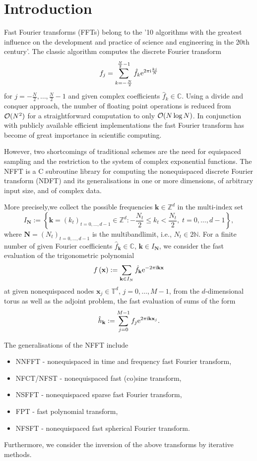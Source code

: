 \hypertarget{index_section_intro_sec}{}\section{Introduction}\label{index_section_intro_sec}
Fast Fourier transforms (FFTs) belong to the '10 algorithms with the greatest influence on the development and practice of science and engineering in the 20th century'. The classic algorithm computes the discrete Fourier transform \[ f_j= \sum_{k=-\frac{N}{2}}^{\frac{N}{2}-1} \hat{f}_{k} {\rm e}^{2\pi{\rm i}\frac{kj}{N}} \] for $j=-\frac{N}{2},\hdots,\frac{N}{2}-1$ and given complex coefficients $\hat{f}_{k}\in\mathbb{C}$. Using a divide and conquer approach, the number of floating point operations is reduced from ${\cal O}(N^2)$ for a straightforward computation to only ${\cal O}(N\log N)$. In conjunction with publicly available efficient implementations the fast Fourier transform has become of great importance in scientific computing.

However, two shortcomings of traditional schemes are the need for equispaced sampling and the restriction to the system of complex exponential functions. The NFFT is a C subroutine library for computing the nonequispaced discrete Fourier transform (NDFT) and its generalisations in one or more dimensions, of arbitrary input size, and of complex data.

More precisely,we collect the possible frequencies $\mathbf{k}\in\mathbb{Z}^d$ in the multi-index set \[ I_{\mathbf{N}} := \left\{ \mathbf{k}=\left(k_t\right)_{t=0,\hdots,d-1} \in \mathbb{Z}^d: - \frac{N_t}{2} \le k_t < \frac{N_t}{2} ,\;t=0,\hdots,d-1\right\}, \] where $\mathbf{N}=\left(N_t\right)_{t=0,\hdots,d-1}$ is the multibandlimit, i.e., $N_t\in 2\mathbb{N}$. For a finite number of given Fourier coefficients $\hat f_{\mathbf{k}} \in \mathbb{C}$, $\mathbf{k}\in I_{\mathbf{N}}$, we consider the fast evaluation of the trigonometric polynomial \[ f\left(\mathbf{x}\right) := \sum_{ \mathbf{k}\in I_{ N}} \hat{f}_{\mathbf{ k}} {\rm e}^{-2\pi{\rm i}\mathbf{k}\mathbf{ x}} \] at given nonequispaced nodes $\mathbf{x}_j \in \mathbb{T}^d$, $j=0,\ldots, M-1$, from the $ d$-dimensional torus as well as the adjoint problem, the fast evaluation of sums of the form \[ \hat h_{\mathbf{k}} := \sum_{j=0}^{M-1} {f}_{j} {\rm e}^{2\pi{\rm i}\mathbf{k}\mathbf{ x}_j}. \]

The generalisations of the NFFT include\begin{itemize}
\item NNFFT - nonequispaced in time and frequency fast Fourier transform,\item NFCT/NFST - nonequispaced fast (co)sine transform,\item NSFFT - nonequispaced sparse fast Fourier transform,\item FPT - fast polynomial transform,\item NFSFT - nonequispaced fast spherical Fourier transform.\end{itemize}


Furthermore, we consider the inversion of the above transforms by iterative methods. 